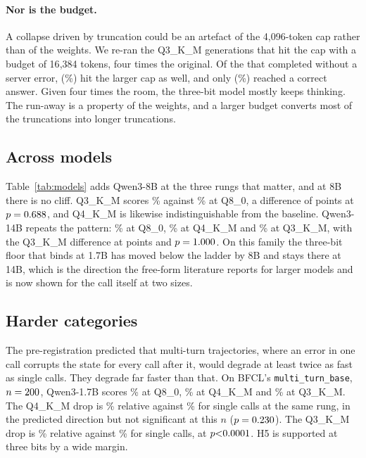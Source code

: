 \documentclass[11pt]{article}
\newcommand{\bfcl}{BFCL}
\newcommand{\qm}{Qwen3-1.7B}
\begin{document}
\paragraph{Nor is the budget.} A collapse driven by truncation could be an artefact of the 4{,}096-token cap rather than of the weights. We re-ran the \qtBudOf{} Q3\_K\_M generations that hit the cap with a budget of 16{,}384 tokens, four times the original. Of the \qtBudN{} that completed without a server error, \qtBudStillCap{} (\qtBudStillCapPct{}\%) hit the larger cap as well, and only \qtBudRecovered{} (\qtBudRecoveredPct{}\%) reached a correct answer. Given four times the room, the three-bit model mostly keeps thinking. The run-away is a property of the weights, and a larger budget converts most of the truncations into longer truncations.

\subsection{Across models}
\label{sec:models}

Table~\ref{tab:models} adds Qwen3-8B at the three rungs that matter, and at 8B there is no cliff. Q3\_K\_M scores \qtAccEightBThree{}\% against \qtAccEightBEight{}\% at Q8\_0, a difference of \qtDeltaEightBThree{} points at $p=0.688{}$, and Q4\_K\_M is likewise indistinguishable from the baseline. Qwen3-14B repeats the pattern: \qtAccFourteenBEight{}\% at Q8\_0, \qtAccFourteenBFour{}\% at Q4\_K\_M and \qtAccFourteenBThree{}\% at Q3\_K\_M, with the Q3\_K\_M difference at \qtDeltaFourteenBThree{} points and $p=1.000{}$. On this family the three-bit floor that binds at 1.7B has moved below the ladder by 8B and stays there at 14B, which is the direction the free-form literature reports for larger models and is now shown for the call itself at two sizes.

\begin{table}[t]
\centering\small

\caption{Tool calling across model size, \texttt{simple\_python}. Qwen3-1.7B at $n=400$; Qwen3-8B and Qwen3-14B at $n=\qtNEightB{}$. Each model is compared against its own Q8\_0.}
\label{tab:models}
\end{table}

\subsection{Harder categories}

The pre-registration predicted that multi-turn trajectories, where an error in one call corrupts the state for every call after it, would degrade at least twice as fast as single calls. They degrade far faster than that. On \bfcl{}'s \texttt{multi\_turn\_base}, $n=200{}$, \qm{} scores \qtMtAccEight{}\% at Q8\_0, \qtMtAccFour{}\% at Q4\_K\_M and \qtMtAccThree{}\% at Q3\_K\_M. The Q4\_K\_M drop is \qtMtRelFour{}\% relative against \qtSingleRelFour{}\% for single calls at the same rung, in the predicted direction but not significant at this $n$ ($p=0.230{}$). The Q3\_K\_M drop is \qtMtRelThree{}\% relative against \qtSingleRelThree{}\% for single calls, at $p\qtMtPThree{}$. H5 is supported at three bits by a wide margin.
\end{document}

